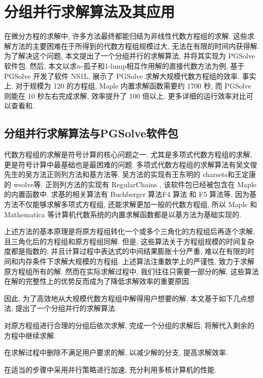 \chapter{分组并行求解算法及其应用}\label{ch03}
在微分方程的求解中, 许多方法最终都能归结为非线性代数方程组的求解. 这些求解方法的主要困难在于所得到的代数方程组规模过大, 无法在有限的时间内获得解. 为了解决这个问题, 本文提出了一个分组并行的求解算法, 并将其实现为 PGSolve 软件包. 然后, 本文以求$n$-孤子和1-lump相互作用解的直接代数方法为例, 基于 PGSolve 开发了软件 NS1L, 展示了 PGSolve 求解大规模代数方程组的效率. 事实上, 对于规模为 120 的方程组, Maple 内置求解函数需要约 1700 秒, 而 PGSolve 则能在 10 秒左右完成求解, 效率提升了 100 倍以上. 更多详细的运行效率对比可以查看和. 

\section{分组并行求解算法与PGSolve软件包}
代数方程组的求解是符号计算的核心问题之一. 尤其是多项式代数方程组的求解, 更是符号计算中最基础也是最困难的问题. 多项式代数方程组的求解算法有吴文俊先生的吴方法\cite{wu1984,wu1985}\D 正则列方法\cite{kalkbrener1991three,lu1994searching}和\Grobner{}基方法\cite{adams1994introduction}等. 吴方法的实现有王东明的 charsets\cite{wang1995implementation}和王定康的 wsolve\cite{wsolve}等. 正则列方法的实现有 RegularChains \cite{maza2000triangular}, 该软件包已经被包含在 Maple 的内置函数中. 求\Grobner{}基的相关算法有 Buchberger 算法\cite{buchberger1970algorithmic}\D F4 算法\cite{faugere1999new} 和 F5 算法\cite{faugere2002new}等. 因为\Grobner{}基方法不仅能够求解多项式方程组, 还能求解更加一般的代数方程组, 所以 Maple 和 Mathematica 等计算机代数系统的内置求解函数都是以\Grobner{}基方法为基础实现的.

上述方法的基本原理是将原方程组转化一个或多个三角化的方程组后再逐个求解, 且三角化后的方程组和原方程组同解. 但是, 这些算法关于方程组规模的时间复杂度都是指数的, 并且计算过程中表达式的中间结果膨胀十分严重, 难以在有限的时间和内存条件下求解大规模的方程组. 上述算法注重数学上的严谨性, 致力于求解原方程组所有的解. 然而在实际求解过程中, 我们往往只需要一部分的解, 这些算法在解的完整性上的优势反而成为了降低求解效率的重要原因. 

因此, 为了高效地从大规模代数方程组中解得用户想要的解, 本文基于如下几点想法, 提出了一个分组并行的求解算法.
\begin{compactenum}[(1)]
\item 对原方程组进行合理的分组后依次求解, 完成一个分组的求解后, 将解代入剩余的方程中继续求解. 
\item 在求解过程中删除不满足用户要求的解, 以减少解的分支, 提高求解效率.
\item 在适当的步骤中采用并行策略进行加速, 充分利用多核计算机的性能.
\end{compactenum}

